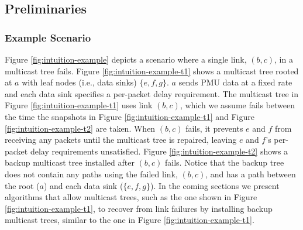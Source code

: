

\subsection{Preliminaries} 
\label{subsec:scenario}

\subsubsection{Example Scenario}

Figure \ref{fig:intuition-example} depicts a scenario where a single link, $(b,c)$, in a multicast tree fails.  %
Figure \ref{fig:intuition-example-t1} shows a multicast tree rooted at $a$ with leaf nodes (i.e., data sinks) $\{e,f,g\}$.  $a$ sends PMU data at a fixed rate and each data sink specifies a per-packet delay requirement. 
The multicast tree in Figure \ref{fig:intuition-example-t1} uses link $(b,c)$, which  we assume fails between the time the snapshots in Figure \ref{fig:intuition-example-t1} and Figure \ref{fig:intuition-example-t2} are taken.
When $(b,c)$ fails, it prevents $e$ and $f$ from receiving any packets until the multicast tree is repaired, leaving $e$ and $f$'s per-packet delay requirements unsatisfied. 
Figure \ref{fig:intuition-example-t2} shows a backup multicast tree installed after $(b,c)$ fails.  Notice that the backup tree does not contain any paths using the failed link, $(b,c)$, and has a path between the root ($a$) and each data sink ($\{e,f,g\}$).  
In the coming sections we present algorithms that allow multicast trees, such as the one shown in Figure \ref{fig:intuition-example-t1}, to recover from link failures by installing backup multicast trees, similar to the one in Figure \ref{fig:intuition-example-t1}.

